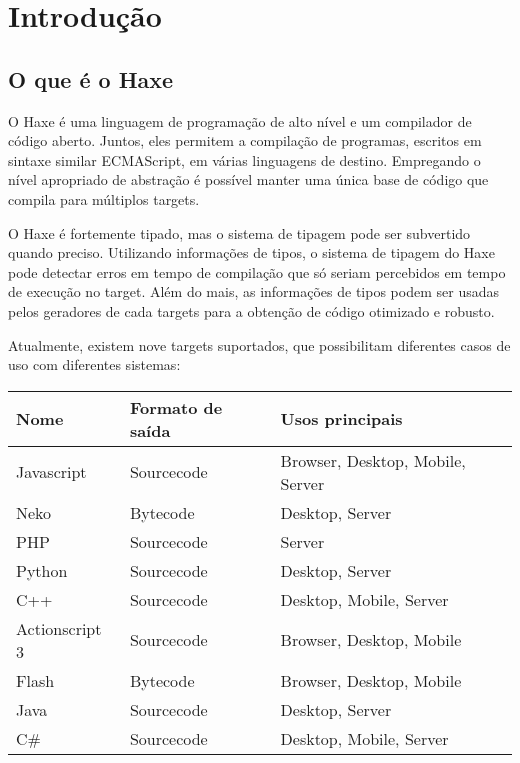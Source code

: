 
\chapter{Introdução}
\label{introduction}

\section{O que é o Haxe}
\label{introduction-what-is-haxe}

O Haxe é uma linguagem de programação de alto nível e um compilador de código aberto. Juntos, eles permitem a compilação de programas, escritos em sintaxe similar ECMAScript, em várias linguagens de destino. Empregando o nível apropriado de abstração é possível manter uma única base de código que compila para múltiplos targets.

O Haxe é fortemente tipado, mas o sistema de tipagem pode ser subvertido quando preciso. Utilizando informações de tipos, o sistema de tipagem do Haxe pode detectar erros em tempo de compilação que só seriam percebidos em tempo de execução no target. Além do mais, as informações de tipos podem ser usadas pelos geradores de cada targets para a obtenção de código otimizado e robusto.

Atualmente, existem nove targets suportados, que possibilitam diferentes casos de uso com diferentes sistemas:

\begin{center}
\begin{tabular}{| l | l | l |}
	\hline
	Nome & Formato de saída & Usos principais \\ \hline
	Javascript & Sourcecode & Browser, Desktop, Mobile, Server \\
	Neko & Bytecode & Desktop, Server \\
	PHP & Sourcecode & Server \\
	Python & Sourcecode & Desktop, Server \\
	C++ & Sourcecode & Desktop, Mobile, Server \\
	Actionscript 3 & Sourcecode & Browser, Desktop, Mobile \\
	Flash & Bytecode & Browser, Desktop, Mobile \\ 
	Java & Sourcecode & Desktop, Server \\
	C\# & Sourcecode & Desktop, Mobile, Server \\ \hline
\end{tabular}
\end{center}

